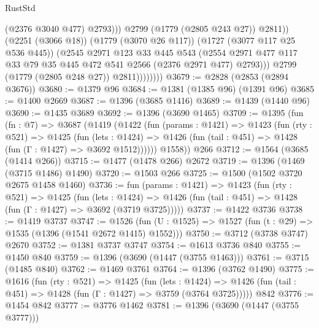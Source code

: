 \begin{lexlean}{RustStd}
\begin{coremodule}
{\begin{coremodule}
{{{{{{{{{{{                                (@2376 @3040 @477)
                                @2793)))
                          @2799
                          (@1779 (@2805 @243 @27))
                          @2811))
                      (@2251 (@3066 @18))
                      (@1779 (@3070 @26 @117))
                      (@1727 (@3077 @117 @25 @536 @445))
                      (@2545
                        @2971
                        @123
                        @33
                        @445
                        @543
                        (@2554
                          @2971
                          @477
                          @117
                          @33
                          @79
                          @35
                          @445
                          @472
                          @541
                          @2566
                          (@2376 @2971 @477)
                          @2793)))
                    @2799
                    (@1779 (@2805 @248 @27))
                    @2811))))))))
@3679 := @2828 (@2853 (@2894 @3676))
@3680 := @1379 @96
@3684 := @1381 (@1385 @96) (@1391 @96)
@3685 := @1400 @2669
@3687 := @1396 (@3685 @1416)
@3689 := @1439 (@1440 @96)
@3690 := @1435 @3689
@3692 := @1396 (@3690 @1465)
@3709 := @1395
    (fun (fn : @7) =>
    @3687
      (@1419
        (@1422
          (fun (params : @1421) =>
          @1423
            (fun (rty : @521) =>
            @1425
              (fun (lets : @1424) =>
              @1426 (fun (tail : @451) => @1428 (fun (Γ : @1427) => @3692 @1512))))))
        @1558))
    @266
@3712 := @1564 (@3685 (@1414 @266))
@3715 := @1477 (@1478 @266) @2672
@3719 := @1396 (@1469 (@3715 @1486) @1490)
@3720 := @1503 @266
@3725 := @1500 (@1502 @3720 @2675 @1458 @1460)
@3736 := fun (params : @1421) =>
  @1423
    (fun (rty : @521) =>
    @1425
      (fun (lets : @1424) =>
      @1426 (fun (tail : @451) => @1428 (fun (Γ : @1427) => @3692 (@3719 @3725)))))
@3737 := @1422 @3736
@3738 := @1419 @3737
@3747 := @1526 (fun (U : @1525) => @1527 (fun (t : @29) => @1535 (@1396 (@1541 @2672 @1415) @1552)))
@3750 := @3712 (@3738 @3747) @2670
@3752 := @1381 @3737 @3747
@3754 := @1613 @3736 @840
@3755 := @1450 @840
@3759 := @1396 (@3690 (@1447 (@3755 @1463)))
@3761 := @3715 (@1485 @840)
@3762 := @1469 @3761
@3764 := @1396 (@3762 @1490)
@3775 := @1616
    (fun (rty : @521) =>
    @1425
      (fun (lets : @1424) =>
      @1426 (fun (tail : @451) => @1428 (fun (Γ : @1427) => @3759 (@3764 @3725)))))
    @842
@3776 := @1454 @842
@3777 := @3776 @1462
@3781 := @1396 (@3690 (@1447 (@3755 @3777)))
}}}}}}}}}}}
\end{coremodule}}
\end{coremodule}
\end{lexlean}
